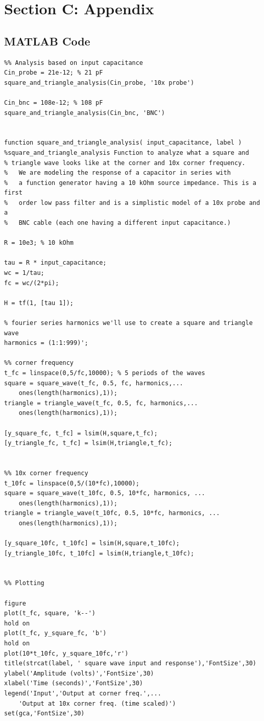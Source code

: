 \documentclass[12pt,letterpaper]{report}
\begin{document}
\section*{Section C: Appendix}
\subsection*{MATLAB Code}
\begin{verbatim}
%% Analysis based on input capacitance
Cin_probe = 21e-12; % 21 pF
square_and_triangle_analysis(Cin_probe, '10x probe')

Cin_bnc = 108e-12; % 108 pF
square_and_triangle_analysis(Cin_bnc, 'BNC')


function square_and_triangle_analysis( input_capacitance, label )
%square_and_triangle_analysis Function to analyze what a square and 
% triangle wave looks like at the corner and 10x corner frequency.
%   We are modeling the response of a capacitor in series with
%   a function generator having a 10 kOhm source impedance. This is a first
%   order low pass filter and is a simplistic model of a 10x probe and a
%   BNC cable (each one having a different input capacitance.)

R = 10e3; % 10 kOhm

tau = R * input_capacitance;
wc = 1/tau;
fc = wc/(2*pi);

H = tf(1, [tau 1]);

% fourier series harmonics we'll use to create a square and triangle wave
harmonics = (1:1:999)'; 

%% corner frequency
t_fc = linspace(0,5/fc,10000); % 5 periods of the waves
square = square_wave(t_fc, 0.5, fc, harmonics,...
    ones(length(harmonics),1));
triangle = triangle_wave(t_fc, 0.5, fc, harmonics,...
    ones(length(harmonics),1));

[y_square_fc, t_fc] = lsim(H,square,t_fc);
[y_triangle_fc, t_fc] = lsim(H,triangle,t_fc);


%% 10x corner frequency
t_10fc = linspace(0,5/(10*fc),10000);
square = square_wave(t_10fc, 0.5, 10*fc, harmonics, ...
    ones(length(harmonics),1));
triangle = triangle_wave(t_10fc, 0.5, 10*fc, harmonics, ...
    ones(length(harmonics),1));

[y_square_10fc, t_10fc] = lsim(H,square,t_10fc);
[y_triangle_10fc, t_10fc] = lsim(H,triangle,t_10fc);


%% Plotting

figure
plot(t_fc, square, 'k--')
hold on
plot(t_fc, y_square_fc, 'b')
hold on
plot(10*t_10fc, y_square_10fc,'r')
title(strcat(label, ' square wave input and response'),'FontSize',30)
ylabel('Amplitude (volts)','FontSize',30)
xlabel('Time (seconds)','FontSize',30)
legend('Input','Output at corner freq.',...
    'Output at 10x corner freq. (time scaled)')
set(gca,'FontSize',30)


\end{verbatim}
\end{document}
